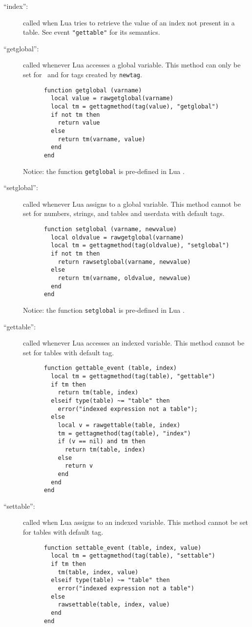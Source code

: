 \begin{description}
\item[``index'':]
called when Lua tries to retrieve the value of an index
not present in a table.
See event \verb|"gettable"| for its semantics.

\item[``getglobal'':]
called whenever Lua accesses a global variable.
This method can only be set for \nil\ and for tags
created by \verb|newtag|.
\begin{verbatim}
      function getglobal (varname)
        local value = rawgetglobal(varname)
        local tm = gettagmethod(tag(value), "getglobal")
        if not tm then
          return value
        else
          return tm(varname, value)
        end
      end
\end{verbatim}
Notice: the function \verb|getglobal| is pre-defined in Lua .

\item[``setglobal'':]
called whenever Lua assigns to a global variable.
This method cannot be set for numbers, strings, and tables and
userdata with default tags.
\begin{verbatim}
      function setglobal (varname, newvalue)
        local oldvalue = rawgetglobal(varname)
        local tm = gettagmethod(tag(oldvalue), "setglobal")
        if not tm then
          return rawsetglobal(varname, newvalue)
        else
          return tm(varname, oldvalue, newvalue)
        end
      end
\end{verbatim}
Notice: the function \verb|setglobal| is pre-defined in Lua .

\item[``gettable'':]
called whenever Lua accesses an indexed variable.
This method cannot be set for tables with default tag.
\begin{verbatim}
      function gettable_event (table, index)
        local tm = gettagmethod(tag(table), "gettable")
        if tm then
          return tm(table, index)
        elseif type(table) ~= "table" then
          error("indexed expression not a table");
        else
          local v = rawgettable(table, index)
          tm = gettagmethod(tag(table), "index")
          if (v == nil) and tm then
            return tm(table, index)
          else
            return v
          end
        end
      end
\end{verbatim}

\item[``settable'':]
called when Lua assigns to an indexed variable.
This method cannot be set for tables with default tag.
\begin{verbatim}
      function settable_event (table, index, value)
        local tm = gettagmethod(tag(table), "settable")
        if tm then
          tm(table, index, value)
        elseif type(table) ~= "table" then
          error("indexed expression not a table")
        else
          rawsettable(table, index, value)
        end
      end
\end{verbatim}


\end{description}
